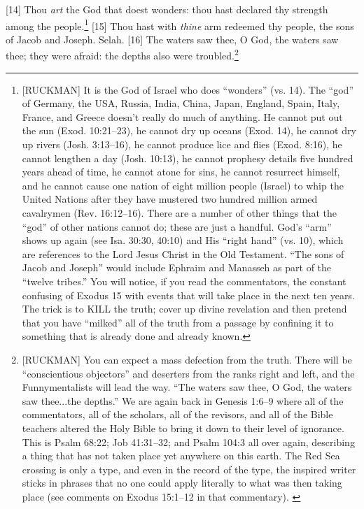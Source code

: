 [14] \textcolor[rgb]{0.00,0.00,1.00}{Thou \emph{art} the God that doest wonders: thou hast declared thy strength among the people.}\footnote{[RUCKMAN] It is the God of Israel who does “wonders” (vs. 14). The “god” of Germany, the USA, Russia, India, China, Japan, England, Spain, Italy, France, and Greece doesn’t really do much of anything. He cannot put out the sun (Exod. 10:21--23), he cannot dry up oceans (Exod. 14), he cannot dry up rivers (Josh. 3:13--16), he cannot produce lice and flies (Exod. 8:16), he cannot lengthen a day (Josh. 10:13), he cannot prophesy details five hundred years ahead of time, he cannot atone for sins, he cannot resurrect himself, and he cannot cause one nation of eight million people (Israel) to whip the United Nations after they have mustered two hundred million armed cavalrymen (Rev. 16:12--16). There are a number of other things that the “god” of other nations cannot do; these are just a handful. God’s “arm” shows up again (see Isa. 30:30, 40:10) and His “right hand” (vs. 10), which are references to the Lord Jesus Christ in the Old Testament. “The sons of Jacob and Joseph” would include Ephraim and Manasseh as part of the “twelve tribes.” You will notice, if you read the commentators, the constant confusing of Exodus 15 with events that will take place in the next ten years. The trick is to KILL the truth; cover up divine revelation and then pretend that you have “milked” all of the truth from a passage by confining it to something that is already done and already known.\cite{Ruckman1992Psalms}}
[15] \textcolor[rgb]{0.00,0.00,1.00}{Thou hast with \emph{thine} arm redeemed thy people, the sons of Jacob and Joseph. Selah.}
[16] \textcolor[rgb]{0.00,0.00,1.00}{The waters saw thee, O God, the waters saw thee; they were afraid: the depths also were troubled.}\footnote{[RUCKMAN] You can expect a mass defection from the truth. There will be ``conscientious objectors'' and deserters from the ranks right and left, and the Funnymentalists will lead the way. ``The waters saw thee, O God, the waters saw thee...the depths.'' We are again back in Genesis 1:6--9 where all of the commentators, all of the scholars, all of the revisors, and all of the Bible teachers altered the Holy Bible to bring it down to their level of ignorance. This is Psalm 68:22; Job 41:31--32; and Psalm 104:3 all over again, describing a thing that has not taken place yet anywhere on this earth. The Red Sea crossing is only a type, and even in the record of the type, the inspired writer sticks in phrases that no one could apply literally to what was then taking place (see comments on Exodus 15:1--12 in that commentary). \cite{Ruckman1992Psalms}}
